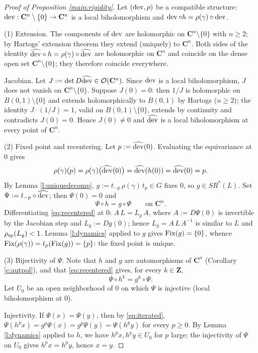 \documentclass[english,11pt]{amsart}
\theoremstyle{definition}
\theoremstyle{remark}
\numberwithin{equation}{section}
\newcommand{\Z}{\mathbf{Z}}
\newcommand{\C}{\mathbf{C}}
\newcommand{\Fix}{\mathop{\rm Fix}}
\newcommand{\rsp}{\rho_{\rm sp}}
\newcommand{\dev}{\mathop{\rm dev}\nolimits}
\begin{document}
\begin{proof}[Proof of Proposition \ref{main:rigidity}]
Let $(\dev,\rho)$ be a compatible structure: $\dev:\C^n\setminus\{0\}\to\C^n$ is a local biholomorphism and $\dev\circ h=\rho(\gamma)\circ\dev$.

(1) Extension. The components of $\dev$ are holomorphic on $\C^n\setminus\{0\}$ with $n\ge2$; by Hartogs' extension theorem they extend (uniquely) to $\C^n$. Both sides of the identity $\widehat{\dev}\circ h=\rho(\gamma)\circ\widehat{\dev}$ are holomorphic on $\C^n$ and coincide on the dense open set $\C^n\setminus\{0\}$; they therefore coincide everywhere.

Jacobian. Let $J:=\det D\widehat{\dev}\in\mathcal O(\C^n)$. Since $\dev$ is a local biholomorphism, $J$ does not vanish on $\C^n\setminus\{0\}$. Suppose $J(0)=0$: then $1/J$ is holomorphic on $B(0,1)\setminus\{0\}$ and extends holomorphically to $B(0,1)$ by Hartogs ($n\ge2$); the identity $J\cdot(1/J)=1$, valid on $B(0,1)\setminus\{0\}$, extends by continuity and contradicts $J(0)=0$. Hence $J(0)\neq0$ and $\widehat{\dev}$ is a local biholomorphism at every point of $\C^n$.

(2) Fixed point and recentering. Let $p:=\widehat{\dev}(0)$. Evaluating the equivariance at $0$ gives
\[
\rho(\gamma)(p)=\rho(\gamma)\big(\widehat{\dev}(0)\big)=\widehat{\dev}(h(0))=\widehat{\dev}(0)=p .
\]
By Lemma \ref{l:uniquedecomp}, $g:=t_{-p}\,\rho(\gamma)\,t_{p}\in G$ fixes $0$, so $g\in SR^*(L)$. Set $\Psi:=t_{-p}\circ\widehat{\dev}$; then $\Psi(0)=0$ and
\begin{equation}\label{eq:recentered}
\Psi\circ h=g\circ\Psi\qquad\text{on }\C^n .
\end{equation}
Differentiating \eqref{eq:recentered} at $0$: $A\,L=L_g\,A$, where $A:=D\Psi(0)$ is invertible by the Jacobian step and $L_g:=Dg(0)$; hence $L_g=A\,L\,A^{-1}$ is similar to $L$ and $\rsp(L_g)<1$. Lemma \ref{l:dynamics} applied to $g$ gives $\Fix(g)=\{0\}$, whence $\Fix(\rho(\gamma))=t_p(\Fix(g))=\{p\}$: the fixed point is unique.

(3) Bijectivity of $\Psi$. Note that $h$ and $g$ are automorphisms of $\C^n$ (Corollary \ref{c:autpol}), and that \eqref{eq:recentered} gives, for every $k\in\Z$,
\begin{equation}\label{eq:iterated}
\Psi\circ h^{k}=g^{k}\circ\Psi .
\end{equation}
Let $U_0$ be an open neighborhood of $0$ on which $\Psi$ is injective (local biholomorphism at $0$).

Injectivity. If $\Psi(x)=\Psi(y)$, then by \eqref{eq:iterated}, $\Psi(h^{p}x)=g^{p}\Psi(x)=g^{p}\Psi(y)=\Psi(h^{p}y)$ for every $p\ge0$. By Lemma \ref{l:dynamics} applied to $h$, we have $h^{p}x,h^{p}y\in U_0$ for $p$ large; the injectivity of $\Psi$ on $U_0$ gives $h^{p}x=h^{p}y$, hence $x=y$.


\end{proof}
\end{document}

